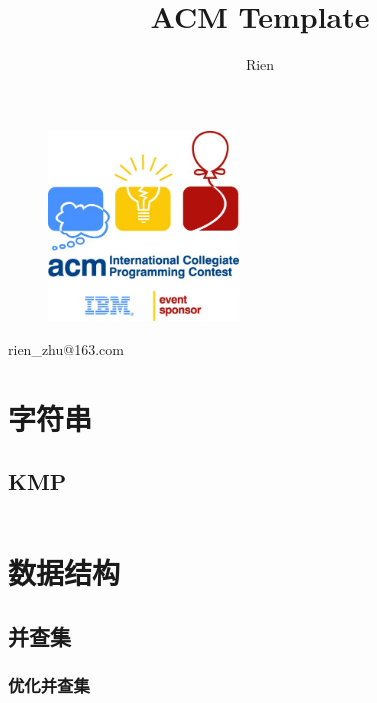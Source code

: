 \documentclass[a4paper,11pt]{article}
\author{Rien}
\title{ACM Template}
\begin{document}
\maketitle %
\thispagestyle{empty}%

\begin{figure}[H]
    \centering
    \includegraphics[width=0.45\textwidth,]{picture/logo.jpg}
    \vspace{0.5cm}
\end{figure}
\centerline{rien\_zhu@163.com}
\newpage %
\tableofcontents %
\thispagestyle{empty}%
\newpage
\setcounter{page}{1}%
\section{字符串}
\subsection{KMP}
\inputminted[breaklines,linenos,frame=leftline]{c++}{string/kmp.cpp}


\newpage
\section{数据结构}

\subsection{并查集}
\subsubsection{优化并查集}
\inputminted[breaklines,linenos,frame=leftline]{c++}{DataStruct/disjoint1.cpp}
\end{document}

